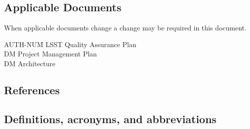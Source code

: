 \subsection{Applicable Documents \label{sect:ad}}
When applicable documents change a change may be required in this document.
\begin{tabbing}
AUTH-NUM\= \kill
{}\>	LSST Quality  Assurance Plan \\
 \>	DM Project Management Plan   \\
\>	DM Architecture\\
\end{tabbing}

\subsection{References}

\renewcommand{\refname}{}


\subsection{Definitions, acronyms, and abbreviations \label{sect:acronyms}}

